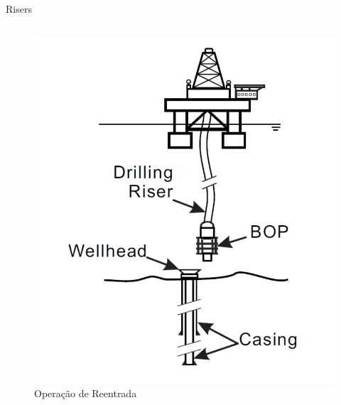 \documentclass[10pt]{beamer}
\begin{document}
\begin{frame}[fragile]{Risers}
\begin{columns}[T]
\begin{column}{.5\textwidth}
\begin{figure}[!ht]
\centering
\includegraphics[width=1\linewidth]{figures/introducao/riser}
\caption{Operação de Reentrada \cite{redytton}}
\end{figure}

\end{column}%
\end{columns}

\end{frame}
\end{document}
